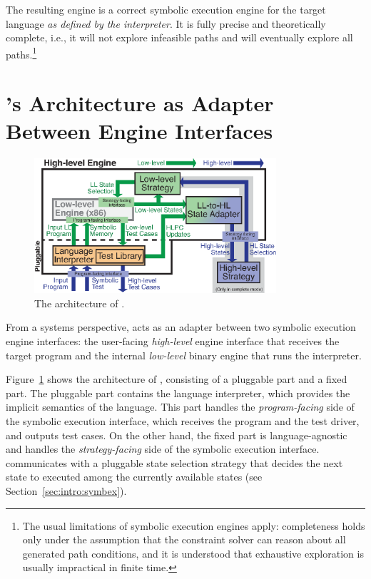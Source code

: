 The resulting engine is a correct symbolic execution engine for the target language \emph{as defined by the interpreter}.
%
It is fully precise and theoretically complete, i.e., it will not explore infeasible paths and will eventually explore all paths.\footnote{The usual limitations of symbolic execution engines apply: completeness holds only under the assumption that the constraint solver can reason about all generated path conditions, and it is understood that exhaustive exploration is usually impractical in finite time.}

\section{\chef's Architecture as Adapter Between Engine Interfaces}

\begin{figure}
  \centering
  \includegraphics[width=0.8\textwidth]{figures/chef/iface-adapter}
  \caption{The architecture of \chef.}
  \label{fig:chef:arch}
\end{figure}

From a systems perspective, \chef acts as an adapter between two symbolic execution engine interfaces:
%
the user-facing \emph{high-level} engine interface that receives the target program and the internal \emph{low-level} binary engine that runs the interpreter.

Figure~\ref{fig:chef:arch} shows the architecture of \chef, consisting of a pluggable part and a fixed part.
%
The pluggable part contains the language interpreter, which provides the implicit semantics of the language.  This part handles the \emph{program-facing} side of the symbolic execution interface, which receives the program and the test driver, and outputs test cases.
%
On the other hand, the fixed part is language-agnostic and handles the \emph{strategy-facing} side of the symbolic execution interface. \chef communicates with a pluggable state selection strategy that decides the next state to executed among the currently available states (see Section~\ref{sec:intro:symbex}).


